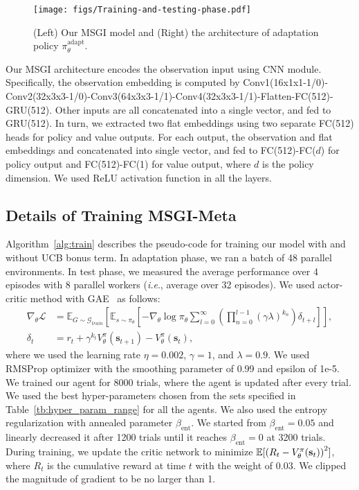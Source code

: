 \documentclass{article} \usepackage{iclr2020_conference,times}
\makeatletter
\newcommand{\nti}{{MSGI}}
\newcommand{\mb}{\mathbf}
\newcommand{\tb}{\textbf}
\DeclareRobustCommand\onedot{\futurelet\@let@token\@onedot}
\def\onedot{.}
\def\ie{\emph{i.e}\onedot} \def\Ie{\emph{I.e}\onedot}
\makeatother
\begin{document}
\begin{figure}[t]
    \centering
    \texttt{[image: figs/Training-and-testing-phase.pdf]}
    \caption{ (Left) Our \nti{} model and (Right) the architecture of adaptation policy $\pi_{\theta}^{\text{adapt}}$.}
    \label{fig:method_repeat}
\end{figure}

Our \nti{} architecture encodes the observation input using CNN module. Specifically, the observation embedding is computed by Conv1(16x1x1-1/0)-Conv2(32x3x3-1/0)-Conv3(64x3x3-1/1)-Conv4(32x3x3-1/1)-Flatten-FC(512)-GRU(512). Other inputs are all concatenated into a single vector, and fed to GRU(512). In turn, we extracted two flat embeddings using two separate FC(512) heads for policy and value outputs. For each output, the observation and flat embeddings and concatenated into single vector, and fed to FC(512)-FC($d$) for policy output and FC(512)-FC(1) for value output, where $d$ is the policy dimension. We used ReLU activation function in all the layers.
\subsection{Details of Training \tb{\nti{}-Meta}}
\label{sec:appendix_training_ntimeta}




Algorithm~\ref{alg:train} describes the pseudo-code for training our \NSGIMeta model with and without UCB bonus term. In adaptation phase, we ran a batch of 48 parallel environments. In test phase, we measured the average performance over 4 episodes with 8 parallel workers (\ie, average over 32 episodes). We used actor-critic method with GAE~\citep{schulman2015high} as follows:
\begin{align}
\nabla_{\theta} \mathcal{L}&= \mathbb{E}_{G\sim \mathcal{G}_{train}}\left[\mathbb{E}_{s \sim \pi_{\theta}} \left[ -\nabla_{\theta}\log\pi_{\theta}\sum^{\infty}_{l=0} \left(\prod_{n=0}^{l-1}{(\gamma\lambda)^{k_n}}\right) \delta_{t+l} \right] \right],\label{eq:multi-gradient}\\
\delta_t &= r_t + \gamma^{k_t} V^{\pi}_{\theta}(\mb{s}_{t+1})  - V^{\pi}_{\theta}(\mb{s}_{t})\label{eq:deltat},
\end{align}
where we used the learning rate $\eta=0.002$, $\gamma=1$, and $\lambda=0.9$. We used RMSProp optimizer with the smoothing parameter of 0.99 and epsilon of 1e-5. We trained our \NSGIMeta agent for 8000 trials, where the agent is updated after every trial. We used the best hyper-parameters chosen from the sets specified in Table~\ref{tb:hyper_param_range} for all the agents.
We also used the entropy regularization with annealed parameter $\beta_{\text{ent}}$.
We started from $\beta_{\text{ent}}=0.05$ and linearly decreased it after 1200 trials until it reaches $\beta_{\text{ent}}=0$ at 3200 trials.
During training, we update the critic network to minimize $\mathbb{E}\large[ \left(R_t - V^{\pi}_{\theta}(\mb{s}_{t}) \right)^2 \large]$, where $R_t$ is the cumulative reward at time $t$ with the weight of 0.03. We clipped the magnitude of gradient to be no larger than 1.
\end{document}
